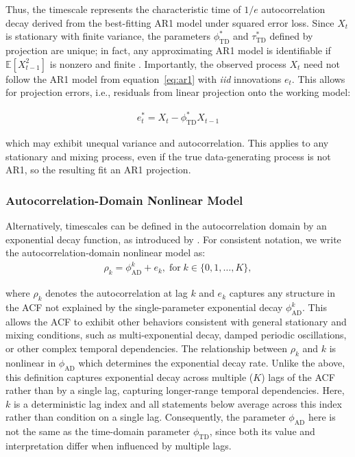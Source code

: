 \documentclass[9pt]{article}
\newcommand{\phitd}{\phi_{\scriptscriptstyle\text{TD}}}
\newcommand{\tautd}{\tau_{\scriptscriptstyle\text{TD}}}
\newcommand{\phiad}{\phi_{\scriptscriptstyle\text{AD}}}
\begin{document}
\noindent Thus, the timescale represents the characteristic time of $1/e$ autocorrelation decay derived from the best-fitting AR1 model under squared error loss. Since $X_t$ is stationary with finite variance, the parameters $\phitd^*$ and $\tautd^*$ defined by projection are unique; in fact, any approximating AR1 model is identifiable if $\mathbb{E}[X_{t-1}^2]$ is nonzero and finite \citep[Theorem~14.28]{hansen_econometrics_2022}. Importantly, the observed process $X_t$ need not follow the AR1 model from equation~\eqref{eq:ar1} with \textit{iid} innovations $e_t$. This allows for projection errors, i.e., residuals from linear projection onto the working model:

\begin{align}
    e_t^* = X_t - \phitd^* X_{t-1}
\end{align}

\noindent which may exhibit unequal variance and autocorrelation. This applies to any stationary and mixing process, even if the true data-generating process is not AR1, so the resulting fit an AR1 projection.

\subsubsection{Autocorrelation-Domain Nonlinear Model}\label{sec:autocorrelation-domain-nonlinear-model}

Alternatively, timescales can be defined in the autocorrelation domain by an exponential decay function, as introduced by \citet{murray_hierarchy_2014}. For consistent notation, we write the autocorrelation-domain nonlinear model as:
\begin{align}\label{eq:nlm}
    \rho_k = \phiad^k + e_k, \; \text{for}\; k \in \{0, 1, \ldots, K\},
\end{align}

\noindent where $\rho_k$ denotes the autocorrelation at lag $k$ and $e_k$ captures any structure in the ACF not explained by the single-parameter exponential decay $\phiad^k$. This allows the ACF to exhibit other behaviors consistent with general stationary and mixing conditions, such as multi-exponential decay, damped periodic oscillations, or other complex temporal dependencies. The relationship between $\rho_k$ and $k$ is nonlinear in $\phiad$ which determines the exponential decay rate. Unlike the  above, this definition captures exponential decay across multiple ($K$) lags of the ACF rather than by a single lag, capturing longer-range temporal dependencies. Here, $k$ is a deterministic lag index and all statements below average across this index rather than condition on a single lag. Consequently, the parameter $\phiad$ here is not the same as the time-domain parameter $\phitd$, since both its value and interpretation differ when influenced by multiple lags.\\
\end{document}
